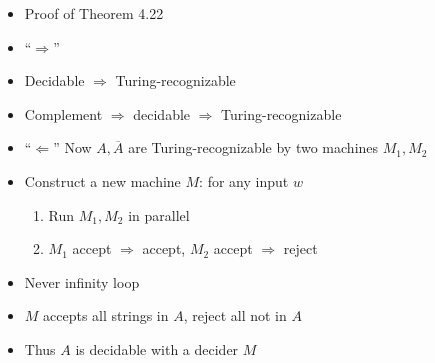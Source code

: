 \begin{frame}[allowframebreaks]
\begin{itemize}
\item Proof of Theorem 4.22
\item ``$\Rightarrow$''

\item [] Decidable $\Rightarrow$ Turing-recognizable

\item [] Complement $\Rightarrow$ decidable $\Rightarrow$
Turing-recognizable

\item ``$\Leftarrow$'' Now  $A,\overline{A}$ are Turing-recognizable
  by two machines $M_1, M_2$
\item Construct a new machine $M$: for any input $w$
\begin{enumerate}
\item Run $M_1,M_2$ in parallel
\item $M_1$ accept $\Rightarrow$ accept, 
$M_2$ accept $\Rightarrow$ reject
\end{enumerate}
\item Never infinity loop

\item $M$ accepts all strings in $A$, reject all not in $A$

\item Thus $A$ is decidable with a decider $M$
\end{itemize}\end{frame}


